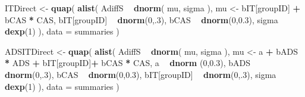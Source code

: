 \documentclass[10pt,dvipsnames,enabledeprecatedfontcommands]{scrartcl}
\newenvironment{Shaded}{\begin{snugshade}}{\end{snugshade}}
\newcommand{\KeywordTok}[1]{\textcolor[rgb]{0.13,0.29,0.53}{\textbf{#1}}}
\newcommand{\DataTypeTok}[1]{\textcolor[rgb]{0.13,0.29,0.53}{#1}}
\newcommand{\DecValTok}[1]{\textcolor[rgb]{0.00,0.00,0.81}{#1}}
\newcommand{\FloatTok}[1]{\textcolor[rgb]{0.00,0.00,0.81}{#1}}
\newcommand{\StringTok}[1]{\textcolor[rgb]{0.31,0.60,0.02}{#1}}
\newcommand{\OperatorTok}[1]{\textcolor[rgb]{0.81,0.36,0.00}{\textbf{#1}}}
\newcommand{\NormalTok}[1]{#1}
\begin{document}
\begin{Shaded}
\begin{Highlighting}[]
\NormalTok{ITDirect <-}\StringTok{ }\KeywordTok{quap}\NormalTok{(}
  \KeywordTok{alist}\NormalTok{(}
\NormalTok{    AdiffS }\OperatorTok{~}\StringTok{ }\KeywordTok{dnorm}\NormalTok{( mu, sigma ),}
\NormalTok{    mu <-}\StringTok{  }\NormalTok{bIT[groupID] }\OperatorTok{+}\StringTok{ }\NormalTok{bCAS }\OperatorTok{*}\StringTok{ }\NormalTok{CAS,}
\NormalTok{    bIT[groupID] }\OperatorTok{~}\StringTok{ }\KeywordTok{dnorm}\NormalTok{(}\DecValTok{0}\NormalTok{,.}\DecValTok{3}\NormalTok{),}
\NormalTok{    bCAS }\OperatorTok{~}\StringTok{ }\KeywordTok{dnorm}\NormalTok{(}\DecValTok{0}\NormalTok{,}\FloatTok{0.3}\NormalTok{),}
\NormalTok{    sigma  }\OperatorTok{~}\StringTok{ }\KeywordTok{dexp}\NormalTok{(}\DecValTok{1}\NormalTok{)}
\NormalTok{  ), }
  \DataTypeTok{data =}\NormalTok{ summaries}
\NormalTok{)}

\NormalTok{ADSITDirect <-}\StringTok{ }\KeywordTok{quap}\NormalTok{(}
  \KeywordTok{alist}\NormalTok{(}
\NormalTok{    AdiffS }\OperatorTok{~}\StringTok{ }\KeywordTok{dnorm}\NormalTok{( mu, sigma ),}
\NormalTok{    mu <-}\StringTok{ }\NormalTok{a }\OperatorTok{+}\StringTok{ }\NormalTok{bADS }\OperatorTok{*}\StringTok{ }\NormalTok{ADS }\OperatorTok{+}\StringTok{  }\NormalTok{bIT[groupID]}\OperatorTok{+}\StringTok{ }\NormalTok{bCAS }\OperatorTok{*}\StringTok{ }\NormalTok{CAS,}
\NormalTok{    a }\OperatorTok{~}\StringTok{ }\KeywordTok{dnorm}\NormalTok{ (}\DecValTok{0}\NormalTok{,}\FloatTok{0.3}\NormalTok{),}
\NormalTok{    bADS }\OperatorTok{~}\StringTok{ }\KeywordTok{dnorm}\NormalTok{(}\DecValTok{0}\NormalTok{,.}\DecValTok{3}\NormalTok{),}
\NormalTok{    bCAS }\OperatorTok{~}\StringTok{ }\KeywordTok{dnorm}\NormalTok{(}\DecValTok{0}\NormalTok{,}\FloatTok{0.3}\NormalTok{),}
\NormalTok{    bIT[groupID] }\OperatorTok{~}\StringTok{ }\KeywordTok{dnorm}\NormalTok{(}\DecValTok{0}\NormalTok{,.}\DecValTok{3}\NormalTok{),}
\NormalTok{    sigma  }\OperatorTok{~}\StringTok{ }\KeywordTok{dexp}\NormalTok{(}\DecValTok{1}\NormalTok{)}
\NormalTok{  ), }
  \DataTypeTok{data =}\NormalTok{ summaries}
\NormalTok{)}



\end{Highlighting}
\end{Shaded}
\end{document}
